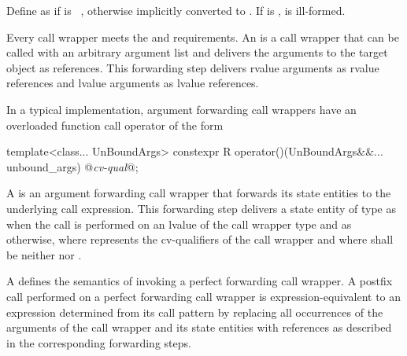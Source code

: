\pnum
{}%
Define  as
if  is \cv{}~, otherwise
 implicitly converted
to .
If
is ,
is ill-formed.

\pnum
{}%
%
%
Every call wrapper meets the 
and  requirements.
An  is a
call wrapper that can be called with an arbitrary argument list
and delivers the arguments to the target object as references.
This forwarding step delivers rvalue arguments as rvalue references
and lvalue arguments as lvalue references.
\begin{note}
In a typical implementation, argument forwarding call wrappers have
an overloaded function call operator of the form
\begin{codeblock}
template<class... UnBoundArgs>
  constexpr R operator()(UnBoundArgs&&... unbound_args) @\textit{cv-qual}@;
\end{codeblock}
\end{note}

\pnum
\label{term.perfect.forwarding.call.wrapper}%
A  is
an argument forwarding call wrapper
that forwards its state entities to the underlying call expression.
This forwarding step delivers a state entity of type 
as \cv{} 
when the call is performed on an lvalue of the call wrapper type and
as \cv{}  otherwise,
where \cv{} represents the cv-qualifiers of the call wrapper and
where \cv{} shall be neither  nor .

\pnum
A  defines the semantics of invoking
a perfect forwarding call wrapper.
A postfix call performed on a perfect forwarding call wrapper is
expression-equivalent to
an expression  determined from its call pattern 
by replacing all occurrences
of the arguments of the call wrapper and its state entities
with references as described in the corresponding forwarding steps.

